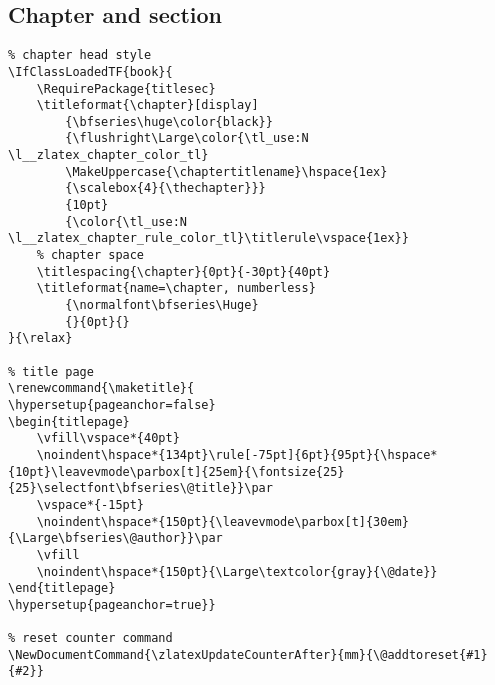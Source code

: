 \subsection{Chapter and section}
\begin{verbatim}
% chapter head style
\IfClassLoadedTF{book}{
    \RequirePackage{titlesec}
    \titleformat{\chapter}[display]
        {\bfseries\huge\color{black}}
        {\flushright\Large\color{\tl_use:N \l__zlatex_chapter_color_tl}
        \MakeUppercase{\chaptertitlename}\hspace{1ex}
        {\scalebox{4}{\thechapter}}}
        {10pt}
        {\color{\tl_use:N \l__zlatex_chapter_rule_color_tl}\titlerule\vspace{1ex}}
    % chapter space
    \titlespacing{\chapter}{0pt}{-30pt}{40pt}
    \titleformat{name=\chapter, numberless}
        {\normalfont\bfseries\Huge}
        {}{0pt}{}
}{\relax}

% title page
\renewcommand{\maketitle}{
\hypersetup{pageanchor=false}
\begin{titlepage}
    \vfill\vspace*{40pt}
    \noindent\hspace*{134pt}\rule[-75pt]{6pt}{95pt}{\hspace*{10pt}\leavevmode\parbox[t]{25em}{\fontsize{25}{25}\selectfont\bfseries\@title}}\par
    \vspace*{-15pt}
    \noindent\hspace*{150pt}{\leavevmode\parbox[t]{30em}{\Large\bfseries\@author}}\par
    \vfill
    \noindent\hspace*{150pt}{\Large\textcolor{gray}{\@date}}
\end{titlepage}
\hypersetup{pageanchor=true}} 

% reset counter command
\NewDocumentCommand{\zlatexUpdateCounterAfter}{mm}{\@addtoreset{#1}{#2}}
\end{verbatim}